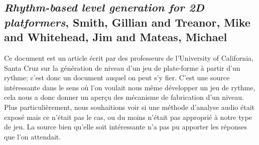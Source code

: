 \subsection{\textit{Rhythm-based level generation for 2D platformers}, Smith, Gillian and Treanor, Mike and Whitehead, Jim and Mateas, Michael}
Ce document est un article écrit par des professeurs de l'University of California, Santa Cruz sur la génération de niveau d'un jeu de plate-forme à partir d'un rythme; c'est donc un document auquel on peut s'y fier. C'est une source intéressante dans le sens où l'on voulait nous même développer un jeu de rythme, cela nous a donc donner un aperçu des mécanisme de fabrication d'un niveau. Plus particulièrement, nous souhaitions voir si une méthode d'analyse audio était exposé mais ce n'était pas le cas, ou du moins n'était pas approprié à notre type de jeu. La source bien qu'elle soit intéressante n'a pas pu apporter les réponses que l'on attendait.